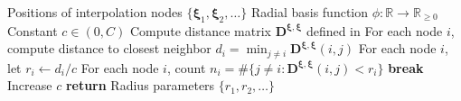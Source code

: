 \begin{algorithmic}[1]
    \Require Positions of interpolation nodes $\{\boldsymbol{\xi}_1, \boldsymbol{\xi}_2, \dots\}$
    \Require Radial basis function $\phi: \mathbb{R} \to \mathbb{R}_{\geq 0}$
    \Require Constant $c \in (0, C)$
    \State Compute distance matrix $\mathbf{D}^{\boldsymbol{\xi}, \boldsymbol{\xi}}$ defined in 
    \State For each node $i$, compute distance to closest neighbor $d_i = \min_{j \neq i} \mathbf{D}^{\boldsymbol{\xi}, \boldsymbol{\xi}}(i, j)$
        \State For each node $i$, let $r_i \gets d_i / c$ 
        \State For each node $i$, count $n_i = \# \{j \neq i: \mathbf{D}^{\boldsymbol{\xi}, \boldsymbol{\xi}}(i, j) < r_i \}$
         
            \State \textbf{break}
        \EndIf
        \State Increase $c$
    \EndWhile
    \State \textbf{return} Radius parameters $\{r_1, r_2, \dots \}$
\end{algorithmic}